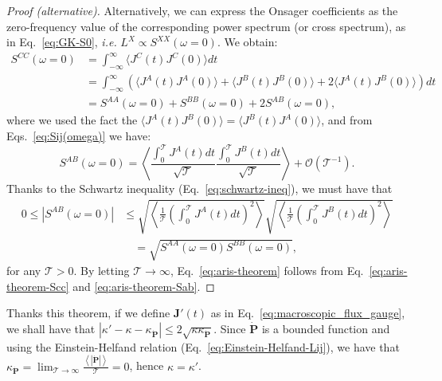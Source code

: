 \begin{proof}[Proof (alternative)]
Alternatively, we can express the Onsager coefficients as the zero-frequency value of the corresponding power spectrum (or cross spectrum), as in Eq.~\eqref{eq:GK-S0}, \emph{i.e.} $L^{X} \propto S^{XX}(\omega=0)$. We obtain:
\begin{align}
    S^{CC}(\omega=0) &= \int_{-\infty}^\infty \langle J^C(t) J^C(0) \rangle dt \nonumber\\
        &=\int_{-\infty}^\infty \left(\langle J^A(t) J^A(0) \rangle + \langle J^B(t) J^B(0) \rangle + 2\langle J^A(t) J^B(0) \rangle \right) dt  \nonumber\\
        &= S^{AA}(\omega=0) + S^{BB}(\omega=0) + 2 S^{AB}(\omega=0), \label{eq:aris-theorem-Scc}
\end{align}
where we used the fact the $\langle J^A(t) J^B(0) \rangle = \langle J^B(t) J^A(0) \rangle$, and from Eqs.~\eqref{eq:Sij(omega)} we have:
\begin{equation}
    S^{AB}(\omega=0) = \left\langle \frac{\int_0^\mathcal{T} J^A(t) dt}{\sqrt{\mathcal{T}}} \frac{\int_0^\mathcal{T} J^B(t) dt}{\sqrt{\mathcal{T}}} \right\rangle + \mathcal{O}(\mathcal{T}^{-1}) .
\end{equation}
Thanks to the Schwartz inequality (Eq.~\eqref{eq:schwartz-ineq}), we must have that
\begin{equation}
\begin{aligned}
    0 \leq \left|S^{AB}(\omega=0)\right| &\leq \sqrt{\left\langle\frac{1}{\mathcal{T}}\left(\int_0^\mathcal{T} J^A(t) dt\right)^2\right\rangle} \sqrt{\left\langle\frac{1}{\mathcal{T}}\left(\int_0^\mathcal{T} J^B(t) dt\right)^2\right\rangle} \\
    &\quad = \sqrt{S^{AA}(\omega=0) S^{BB}(\omega=0)} ,
\end{aligned} \label{eq:aris-theorem-Sab}
\end{equation}
for any $\mathcal{T}>0$. By letting $\mathcal{T}\rightarrow\infty$, Eq.~\eqref{eq:aris-theorem} follows from Eq.~\eqref{eq:aris-theorem-Scc} and \eqref{eq:aris-theorem-Sab}.
\end{proof}

\smallskip
Thanks this theorem, if we define $\mathbf{J}'(t)$ as in Eq.~\eqref{eq:macroscopic_flux_gauge}, we shall have that $\left| \kappa' - \kappa - \kappa_{\dot{\mathbf{P}}} \right| \leq 2 \sqrt{\kappa \kappa_{\dot{\mathbf{P}}}}$. Since $\mathbf{\dot{P}}$ is a bounded function and using the Einstein-Helfand relation (Eq.~\ref{eq:Einstein-Helfand-Lij}), we have that $\kappa_{\dot{\mathbf{P}}} = \lim_{\mathcal{T}\rightarrow\infty} \frac{\left\langle |\dot{\mathbf{P}}| \right\rangle}{\mathcal{T}} = 0$, hence $\kappa = \kappa'$. 



